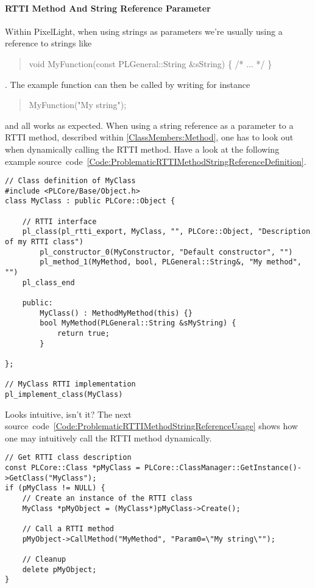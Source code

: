 \paragraph{RTTI Method And String Reference Parameter}
\label{Appendix:CommonPitfalls:RTTIMethodStringReferenceParameter}
Within PixelLight, when using strings as parameters we're usually using a reference to strings like \begin{quote}void MyFunction(const PLGeneral::String \&sString) \{ /* ... */ \}\end{quote}. The example function can then be called by writing for instance \begin{quote}MyFunction("My string");\end{quote} and all works as expected. When using a string reference as a parameter to a RTTI method, described within \ref{ClassMembers:Method}, one has to look out when dynamically calling the RTTI method. Have a look at the following example source~code~\ref{Code:ProblematicRTTIMethodStringReferenceDefinition}.
\begin{lstlisting}[label=Code:ProblematicRTTIMethodStringReferenceDefinition,caption={Problematic RTTI method and string reference parameter definition}]
// Class definition of MyClass
#include <PLCore/Base/Object.h>
class MyClass : public PLCore::Object {

	// RTTI interface
	pl_class(pl_rtti_export, MyClass, "", PLCore::Object, "Description of my RTTI class")
		pl_constructor_0(MyConstructor, "Default constructor", "")
		pl_method_1(MyMethod, bool, PLGeneral::String&, "My method", "")
	pl_class_end

	public:
		MyClass() : MethodMyMethod(this) {}
		bool MyMethod(PLGeneral::String &sMyString) {
			return true;
		}

};

// MyClass RTTI implementation
pl_implement_class(MyClass)
\end{lstlisting}
Looks intuitive, isn't it? The next source~code~\ref{Code:ProblematicRTTIMethodStringReferenceUsage} shows how one may intuitively call the RTTI method dynamically.
\begin{lstlisting}[label=Code:ProblematicRTTIMethodStringReferenceUsage,caption={Problematic RTTI method and string reference parameter usage}]
// Get RTTI class description
const PLCore::Class *pMyClass = PLCore::ClassManager::GetInstance()->GetClass("MyClass");
if (pMyClass != NULL) {
	// Create an instance of the RTTI class
	MyClass *pMyObject = (MyClass*)pMyClass->Create();

	// Call a RTTI method
	pMyObject->CallMethod("MyMethod", "Param0=\"My string\"");

	// Cleanup
	delete pMyObject;
}
\end{lstlisting}
